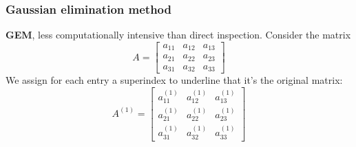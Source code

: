 \subsubsection{Gaussian elimination method}
\textbf{GEM}, less computationally intensive than direct inspection. Consider the matrix
$$
A=\begin{bmatrix}
    a_{11} & a_{12} & a_{13}\\
    a_{21} & a_{22} & a_{23}\\
    a_{31} & a_{32} & a_{33}
\end{bmatrix}
$$
We assign for each entry a superindex to underline that it's the original matrix:
$$
A^{(1)}=\begin{bmatrix}
    a_{11}^{(1)} & a_{12}^{(1)} & a_{13}^{(1)}\\
    a_{21}^{(1)} & a_{22}^{(1)} & a_{23}^{(1)}\\
    a_{31}^{(1)} & a_{32}^{(1)} & a_{33}^{(1)}
\end{bmatrix}
$$
